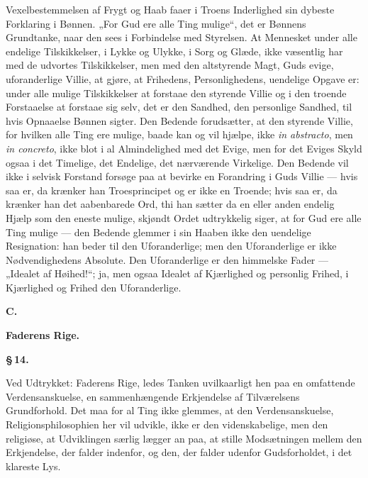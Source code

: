 \documentclass[12pt]{book}
\newcommand{\parthead}[1]{%
  \clearpage
  \begin{center}{\LARGE\bfseries #1}\end{center}\vspace{2pt}%
  \phantomsection\addcontentsline{toc}{section}{#1}\markboth{#1}{#1}}
\newcommand{\parmark}[1]{\begin{center}{\bfseries \S\,#1.}\end{center}}
\begin{document}
Vexelbestemmelsen af Frygt og Haab faaer i Troens Inderlighed sin
dybeste Forklaring i Bønnen. „For Gud ere alle Ting mulige“, det er
Bønnens Grundtanke, naar den sees i Forbindelse med Styrelsen. At
Mennesket under alle endelige Tilskikkelser, i Lykke og Ulykke, i
Sorg og Glæde, ikke væsentlig har med de udvortes Tilskikkelser, men
med den altstyrende Magt, Guds evige, uforanderlige Villie, at
gjøre, at Frihedens, Personlighedens, uendelige Opgave er: under
alle mulige Tilskikkelser at forstaae den styrende Villie og i den
troende Forstaaelse at forstaae sig selv, det er den Sandhed, den
personlige Sandhed, til hvis Opnaaelse Bønnen sigter. Den Bedende
forudsætter, at den styrende Villie, for hvilken alle Ting ere
mulige, baade kan og vil hjælpe, ikke \textit{in abstracto}, men
\textit{in concreto}, ikke blot i al Almindelighed med det Evige,
men for det Eviges Skyld ogsaa i det Timelige, det Endelige, det
nærværende Virkelige. Den Bedende vil ikke i selvisk Forstand
forsøge paa at bevirke en Forandring i Guds Villie --- hvis saa er,
da krænker han Troesprincipet og er ikke en Troende; hvis saa er, da
krænker han det aabenbarede Ord, thi han sætter da en eller anden
endelig Hjælp som den eneste mulige, skjøndt Ordet udtrykkelig
siger, at for Gud ere alle Ting mulige --- den Bedende glemmer i sin
Haaben ikke den uendelige Resignation: han beder til den
Uforanderlige; men den Uforanderlige er ikke Nødvendighedens
Absolute. Den Uforanderlige er den himmelske Fader --- „Idealet af
Høihed!“; ja, men ogsaa Idealet af Kjærlighed og personlig Frihed, i
Kjærlighed og Frihed den Uforanderlige.
\parthead{C.}
\begin{center}{\LARGE\bfseries Faderens Rige.}\end{center}\vspace{2pt}
\parmark{14}

Ved Udtrykket: Faderens Rige, ledes Tanken uvilkaarligt hen paa en
omfattende Verdensanskuelse, en sammenhængende Erkjendelse af
Tilværelsens Grundforhold. Det maa for al Ting ikke glemmes, at den
Verdensanskuelse, Religionsphilosophien her vil udvikle, ikke er den
videnskabelige, men den religiøse, at Udviklingen særlig lægger an
paa, at stille Modsætningen mellem den Erkjendelse, der falder
indenfor, og den, der falder udenfor Gudsforholdet, i det klareste
Lys.
\end{document}
